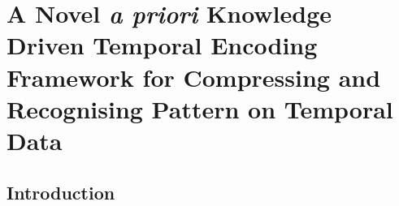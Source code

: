 \chapter{A Novel \emph{a priori} Knowledge Driven Temporal Encoding Framework for Compressing and Recognising Pattern on Temporal Data }
\label{chap:encoding}

\section{Introduction}


	
	
